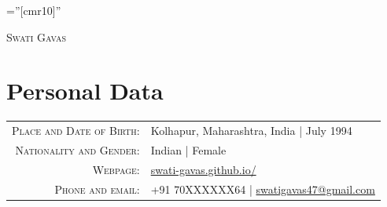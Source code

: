 \documentclass[a4paper,10pt]{article}
\begin{document}

\pagestyle{empty} %

\font\fb=''[cmr10]'' %

\par{\filleft
		{\Large \textsc{Swati Gavas}
		\\
	}\par}
\vspace{0.2cm}

\section{Personal Data}

\begin{tabular}{rl}
    \textsc{Place and Date of Birth:} & Kolhapur, Maharashtra, India  | July 1994 \\
     \textsc{Nationality and Gender:} & Indian  | Female \\
      \textsc{Webpage:} & \href{https://swati-gavas.github.io}{swati-gavas.github.io/} \\
    \textsc{Phone and email:}     & +91 70XXXXXX64 | \href{mailto:swatigavas47@gmail.com}{swatigavas47@gmail.com}\\
\end{tabular}
\end{document}
